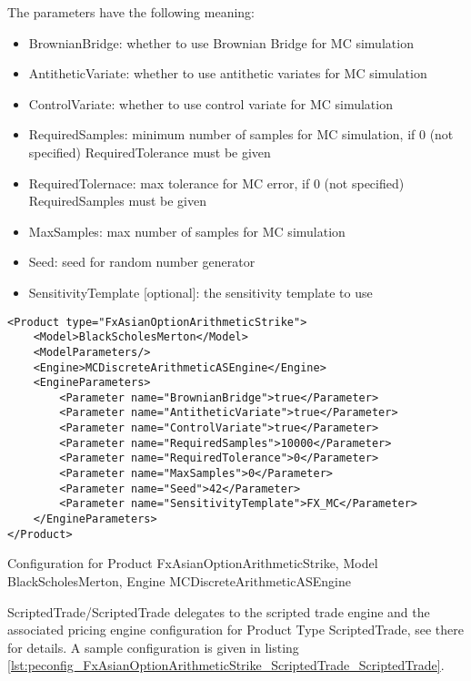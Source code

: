 The parameters have the following meaning:

\begin{itemize}
\item BrownianBridge: whether to use Brownian Bridge for MC simulation
\item AntitheticVariate: whether to use antithetic variates for MC simulation
\item ControlVariate: whether to use control variate for MC simulation
\item RequiredSamples: minimum number of samples for MC simulation, if 0 (not specified) RequiredTolerance must be given
\item RequiredTolernace: max tolerance for MC error, if 0 (not specified) RequiredSamples must be given
\item MaxSamples: max number of samples for MC simulation
\item Seed: seed for random number generator
\item SensitivityTemplate [optional]: the sensitivity template to use 
\end{itemize}

\begin{longlisting}
\begin{verbatim}
<Product type="FxAsianOptionArithmeticStrike">
    <Model>BlackScholesMerton</Model>
    <ModelParameters/>
    <Engine>MCDiscreteArithmeticASEngine</Engine>
    <EngineParameters>
        <Parameter name="BrownianBridge">true</Parameter>    
        <Parameter name="AntitheticVariate">true</Parameter>    
        <Parameter name="ControlVariate">true</Parameter>    
        <Parameter name="RequiredSamples">10000</Parameter>    
        <Parameter name="RequiredTolerance">0</Parameter>    
        <Parameter name="MaxSamples">0</Parameter>    
        <Parameter name="Seed">42</Parameter>    
        <Parameter name="SensitivityTemplate">FX_MC</Parameter>
    </EngineParameters>
</Product>
\end{verbatim}
\caption{Configuration for Product FxAsianOptionArithmeticStrike, Model BlackScholesMerton, Engine MCDiscreteArithmeticASEngine}
\label{lst:peconfig_FxAsianOptionArithmeticStrike_BlackScholesMerton_MCDiscreteArithmeticASEngine}
\end{longlisting}

ScriptedTrade/ScriptedTrade delegates to the scripted trade engine and the associated pricing engine configuration for
Product Type ScriptedTrade, see there for details. A sample configuration is given in listing
\ref{lst:peconfig_FxAsianOptionArithmeticStrike_ScriptedTrade_ScriptedTrade}.

